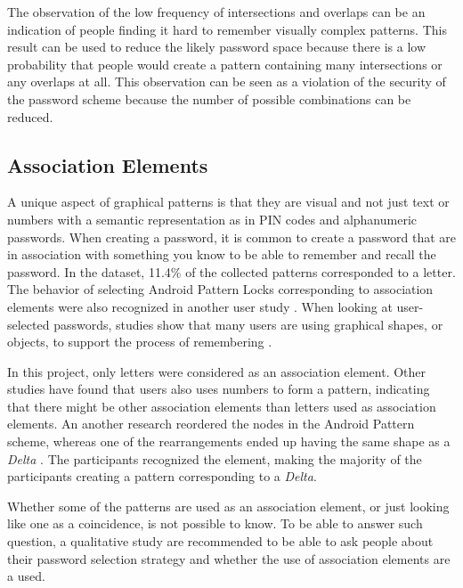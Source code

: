       The observation of the low frequency of intersections and overlaps can be an indication of people finding it hard to remember visually complex patterns. This result can be used to reduce the likely password space because there is a low probability that people would create a pattern containing many intersections or any overlaps at all. This observation can be seen as a violation of the security of the password scheme because the number of possible combinations can be reduced. 
    
    \clearpage
    \subsection{Association Elements}
      A unique aspect of graphical patterns is that they are visual and not just text or numbers with a semantic representation as in PIN codes and alphanumeric passwords. When creating a password, it is common to create a password that are in association with something you know to be able to remember and recall the password. In the dataset, 11.4\% of the collected patterns corresponded to a letter. The behavior of selecting Android Pattern Locks corresponding to association elements were also recognized in another user study \cite{Sun}. When looking at user-selected passwords, studies show that many users are using graphical shapes, or objects, to support the process of remembering \cite{Weiss}. 

      In this project, only letters were considered as an association element. Other studies have found that users also uses numbers to form a pattern, indicating that there might be other association elements than letters used as association elements. An another research reordered the nodes in the Android Pattern scheme, whereas one of the rearrangements ended up having the same shape as a {\it Delta} \cite{Uellenbeck}. The participants recognized the element, making the majority of the participants creating a pattern corresponding to a {\it Delta}. 

      Whether some of the patterns are used as an association element, or just looking like one as a coincidence, is not possible to know. To be able to answer such question, a qualitative study are recommended to be able to ask people about their password selection strategy and whether the use of association elements are a used. 

